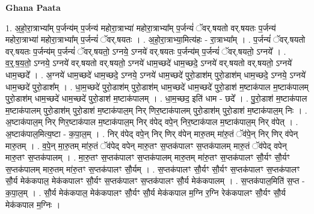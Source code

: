 \documentclass[17pt]{extarticle}
\begin{document}
\textbf{Ghana Paata } \newline

1. अ॒हो॒रा॒त्राभ्या᳚म् प॒र्जन्य॑म् प॒र्जन्य॑ महोरा॒त्राभ्या॑ महोरा॒त्राभ्या᳚म् प॒र्जन्यं॑ ॅवर्.षयतो वर्.षयतः प॒र्जन्य॑ महोरा॒त्राभ्या॑ महोरा॒त्राभ्या᳚म् प॒र्जन्यं॑ ॅवर्.षयतः । . अ॒हो॒रा॒त्राभ्या॒मित्य॑हः - रा॒त्राभ्या᳚म् । . प॒र्जन्यं॑ ॅवर्.षयतो वर्.षयतः प॒र्जन्य॑म् प॒र्जन्यं॑ ॅवर्.षयतो॒ ऽग्नये॒ ऽग्नये॑ वर्.षयतः प॒र्जन्य॑म् प॒र्जन्यं॑ ॅवर्.षयतो॒ ऽग्नये᳚ । . व॒र्॒.ष॒य॒तो॒ ऽग्नये॒ ऽग्नये॑ वर्.षयतो वर्.षयतो॒ ऽग्नये॑ धाम॒च्छदे॑ धाम॒च्छदे॒ ऽग्नये॑ वर्.षयतो वर्.षयतो॒ ऽग्नये॑ धाम॒च्छदे᳚ । . अ॒ग्नये॑ धाम॒च्छदे॑ धाम॒च्छदे॒ ऽग्नये॒ ऽग्नये॑ धाम॒च्छदे॑ पुरो॒डाश॑म् पुरो॒डाश॑म् धाम॒च्छदे॒ ऽग्नये॒ ऽग्नये॑ धाम॒च्छदे॑ पुरो॒डाश᳚म् । . धा॒म॒च्छदे॑ पुरो॒डाश॑म् पुरो॒डाश॑म् धाम॒च्छदे॑ धाम॒च्छदे॑ पुरो॒डाश॑ म॒ष्टाक॑पाल म॒ष्टाक॑पालम् पुरो॒डाश॑म् धाम॒च्छदे॑ धाम॒च्छदे॑ पुरो॒डाश॑ म॒ष्टाक॑पालम् । . धा॒म॒च्छद॒ इति॑ धाम - छदे᳚ । . पु॒रो॒डाश॑ म॒ष्टाक॑पाल म॒ष्टाक॑पालम् पुरो॒डाश॑म् पुरो॒डाश॑ म॒ष्टाक॑पाल॒म् निर् णिर॒ष्टाक॑पालम् पुरो॒डाश॑म् पुरो॒डाश॑ म॒ष्टाक॑पाल॒म् निः । . अ॒ष्टाक॑पाल॒म् निर् णिर॒ष्टाक॑पाल म॒ष्टाक॑पाल॒म् निर् व॑पेद् वपे॒न् निर॒ष्टाक॑पाल म॒ष्टाक॑पाल॒म् निर् व॑पेत् । . अ॒ष्टाक॑पाल॒मित्य॒ष्टा - क॒पा॒ल॒म् । . निर् व॑पेद् वपे॒न् निर् णिर् व॑पेन् मारु॒तम् मा॑रु॒तं ॅव॑पे॒न् निर् णिर् व॑पेन् मारु॒तम् । . व॒पे॒न् मा॒रु॒तम् मा॑रु॒तं ॅव॑पेद् वपेन् मारु॒तꣳ स॒प्तक॑पालꣳ स॒प्तक॑पालम् मारु॒तं ॅव॑पेद् वपेन् मारु॒तꣳ स॒प्तक॑पालम् । . मा॒रु॒तꣳ स॒प्तक॑पालꣳ स॒प्तक॑पालम् मारु॒तम् मा॑रु॒तꣳ स॒प्तक॑पालꣳ सौ॒र्यꣳ सौ॒र्यꣳ स॒प्तक॑पालम् मारु॒तम् मा॑रु॒तꣳ स॒प्तक॑पालꣳ सौ॒र्यम् । . स॒प्तक॑पालꣳ सौ॒र्यꣳ सौ॒र्यꣳ स॒प्तक॑पालꣳ स॒प्तक॑पालꣳ सौ॒र्य मेक॑कपाल॒ मेक॑कपालꣳ सौ॒र्यꣳ स॒प्तक॑पालꣳ स॒प्तक॑पालꣳ सौ॒र्य मेक॑कपालम् । . स॒प्तक॑पाल॒मिति॑ स॒प्त - क॒पा॒ल॒म् । . सौ॒र्य मेक॑कपाल॒ मेक॑कपालꣳ सौ॒र्यꣳ सौ॒र्य मेक॑कपाल म॒ग्नि र॒ग्नि रेक॑कपालꣳ सौ॒र्यꣳ सौ॒र्य मेक॑कपाल म॒ग्निः । \newline
\end{document}
